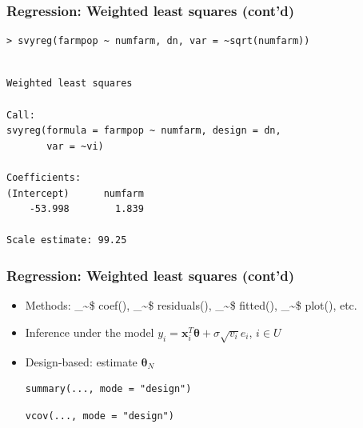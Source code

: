 \documentclass[framenumber,t]{beamer}
\makeatletter
\newcommand\code{\bgroup\@makeother\_\@makeother\~\@makeother\$\@makeother\^\@codex}
\def\@codex#1{{\normalfont\ttfamily\hyphenchar\font=-1 #1}\egroup}
\makeatother
\begin{document}
\begin{frame}[fragile]
    \frametitle{Regression: Weighted least squares {\small (cont'd)}}
    \begin{lstlisting}[style=in_small]
> svyreg(farmpop ~ numfarm, dn, var = ~sqrt(numfarm))
    \end{lstlisting}
    \vspace{-1em}
    \begin{lstlisting}[style=out_small]

Weighted least squares

Call:
svyreg(formula = farmpop ~ numfarm, design = dn,
       var = ~vi)

Coefficients:
(Intercept)      numfarm
    -53.998        1.839

Scale estimate: 99.25
    \end{lstlisting}
\end{frame}

\begin{frame}[fragile]
    \frametitle{Regression: Weighted least squares {\small (cont'd)}}
    \begin{itemize}
        \setlength\itemsep{1em}
        \item \alert{Methods}: \code{coef()}, \code{residuals()},
            \code{fitted()}, \code{plot()}, etc.
        \item \alert{Inference} under the model
            $y_i = \bm x_i^T \bm \theta + \sigma \sqrt{v_i} e_i$, $i \in U$
        \item \alert{Design-based}: estimate $\bm \theta_N$
        \begin{verbatim}summary(..., mode = "design")\end{verbatim}
        \begin{verbatim}vcov(..., mode = "design")\end{verbatim}
    \end{itemize}
\end{frame}
\end{document}
